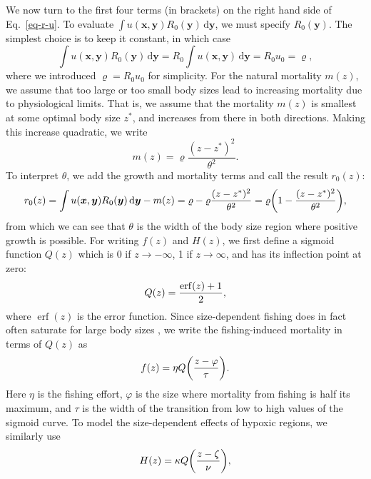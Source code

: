 \documentclass{article}
\newcommand{\mat}[1]{\bm{#1}}
\DeclareMathOperator\erf{erf}
\newcommand{\ud}{\text{d}}
\let\originalleft\left
\let\originalright\right
\renewcommand{\left}{\mathopen{}\mathclose\bgroup\originalleft}
\renewcommand{\right}{\aftergroup\egroup\originalright}
\begin{document}
We now turn to the first four terms (in brackets) on the right hand side of Eq.~\ref{eq-r-u}. To evaluate $\int u(\mat{x}, \mat{y}) R_0(\mat{y}) \,\ud\mat{y}$, we must specify $R_0(\mat{y})$. The simplest choice is to keep it constant, in which case
\begin{equation}
  \label{eq-uR0}
  \int u(\mat{x}, \mat{y}) R_0(\mat{y}) \,\ud\mat{y}
  = R_0 \int u(\mat{x}, \mat{y}) \,\ud\mat{y}
  = R_0 u_0
  = \varrho ,
\end{equation}
where we introduced $\varrho = R_0 u_0$ for simplicity. For the natural mortality $m(z)$, we assume that too large or too small body sizes lead to increasing mortality due to physiological limits. That is, we assume that the mortality $m(z)$ is smallest at some optimal body size $z^*$, and increases from there in both directions. Making this increase quadratic, we write
\begin{equation}
  \label{eq-m}
  m(z) = \varrho \frac{(z-z^*)^2}{\theta^{2}} .
\end{equation}
To interpret $\theta$, we add the growth and mortality terms and call the result $r_0(z)$:
\begin{equation}
  \label{eq-r0}
  r_0(z)
  = \int u(\mat{x}, \mat{y}) R_0(\mat{y}) \,\ud\mat{y} - m(z)
  = \varrho - \varrho \frac{(z-z^*)^2}{\theta^{2}}
  = \varrho \left( 1 - \frac{(z-z^*)^2}{\theta^{2}} \right) ,
\end{equation}
from which we can see that $\theta$ is the width of the body size region where positive growth is possible. For writing $f(z)$ and $H(z)$, we first define a sigmoid function $Q(z)$ which is 0 if $z \to -\infty$, 1 if $z \to \infty$, and has its inflection point at zero:
\begin{equation}
  \label{eq-sigmoid}
  Q(z) = \frac{\erf\left(z\right) + 1}{2} ,
\end{equation}
where $\erf(z)$ is the error function. Since size-dependent fishing does in fact often saturate for large body sizes \citep{Brinkhof2020}, we write the fishing-induced mortality in terms of $Q(z)$ as
\begin{equation}
  \label{eq-fishing}
  f(z) = \eta Q\left( \frac{z - \varphi}{\tau} \right) .
\end{equation}
Here $\eta$ is the fishing effort, $\varphi$ is the size where mortality from fishing is half its maximum, and $\tau$ is the width of the transition from low to high values of the sigmoid curve. To model the size-dependent effects of hypoxic regions, we similarly use
\begin{equation}
  \label{eq-hypoxia}
  H(z) = \kappa Q\left( \frac{z-\zeta}{\nu} \right) ,
\end{equation}
\end{document}
